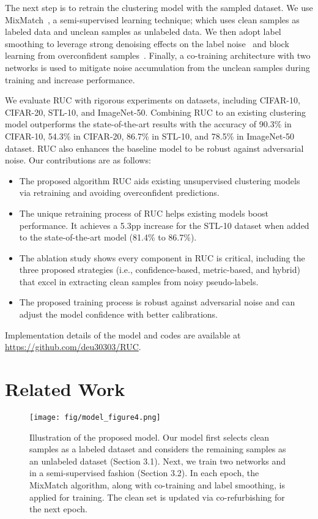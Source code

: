 \documentclass[final]{cvpr}
\newcommand{\model}{\textsf{RUC}}
\begin{document}
The next step is to retrain the clustering model with the sampled dataset. We use MixMatch~\cite{berthelot2019mixmatch}, a semi-supervised learning technique; which uses clean samples as labeled data and unclean samples as unlabeled data. We then adopt label smoothing to leverage strong denoising effects on the label noise~\cite{lukasik2020does} and block learning from overconfident samples~\cite{ji2019invariant,van2020scan}. Finally, a co-training architecture with two networks is used to mitigate noise accumulation from the unclean samples during training and increase performance.
 

We evaluate \model{} with rigorous experiments on datasets, including CIFAR-10, CIFAR-20, STL-10, and ImageNet-50. Combining \model{} to an existing clustering model outperforms the state-of-the-art results with the accuracy of 90.3\% in CIFAR-10, 54.3\% in CIFAR-20, 86.7\% in STL-10, and 78.5\% in ImageNet-50 dataset. \model{} also enhances the baseline model to be robust against adversarial noise. Our contributions are as follows: 
\begin{itemize}[noitemsep, topsep=2pt]
    \item The proposed algorithm \model{} aids existing unsupervised clustering models via retraining and avoiding overconfident predictions. 
    
    \item The unique retraining process of \model{} helps existing models boost performance. It achieves a 5.3pp increase for the STL-10 dataset when added to the state-of-the-art model (81.4\% to 86.7\%).
    
    \item The ablation study shows every component in \model{} is critical, including the three proposed strategies (i.e., confidence-based, metric-based, and hybrid) that excel in extracting clean samples from noisy pseudo-labels.
    
    \item The proposed training process is robust against adversarial noise and can adjust the model confidence with better calibrations.  
\end{itemize}

Implementation details of the model and codes are available at \url{https://github.com/deu30303/RUC}.
 \section{Related Work}
\begin{figure*}[t!]
    \centerline{
    \texttt{[image: fig/model\_figure4.png]}}
    \caption{Illustration of the proposed model. Our model first selects clean samples as a labeled dataset  and considers the remaining samples as an unlabeled dataset  (Section 3.1). Next, we train two networks  and  in a semi-supervised fashion (Section 3.2). In each epoch, the MixMatch algorithm, along with co-training and label smoothing, is applied for training. The clean set is updated via co-refurbishing for the next epoch.}
    \label{fig:mainmodel_fig}
\end{figure*}
\end{document}
